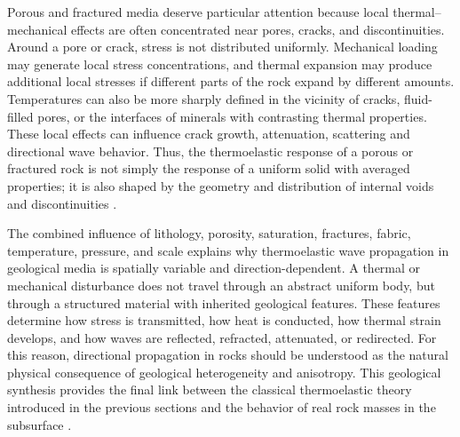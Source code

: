 Porous and fractured media deserve particular attention because local thermal--mechanical effects are often concentrated near pores, cracks, and discontinuities. Around a pore or crack, stress is not distributed uniformly. Mechanical loading may generate local stress concentrations, and thermal expansion may produce additional local stresses if different parts of the rock expand by different amounts. Temperatures can also be more sharply defined in the vicinity of cracks, fluid-filled pores, or the interfaces of minerals with contrasting thermal properties. These local effects can influence crack growth, attenuation, scattering and directional wave behavior. Thus, the thermoelastic response of a porous or fractured rock is not simply the response of a uniform solid with averaged properties; it is also shaped by the geometry and distribution of internal voids and discontinuities \cite{jaeger2007,schultz2019,robertson1988}.

The combined influence of lithology, porosity, saturation, fractures, fabric, temperature, pressure, and scale explains why thermoelastic wave propagation in geological media is spatially variable and direction-dependent. A thermal or mechanical disturbance does not travel through an abstract uniform body, but through a structured material with inherited geological features. These features determine how stress is transmitted, how heat is conducted, how thermal strain develops, and how waves are reflected, refracted, attenuated, or redirected. For this reason, directional propagation in rocks should be understood as the natural physical consequence of geological heterogeneity and anisotropy. This geological synthesis provides the final link between the classical thermoelastic theory introduced in the previous sections and the behavior of real rock masses in the subsurface \cite{aki2002,mavko2009,jaeger2007}.